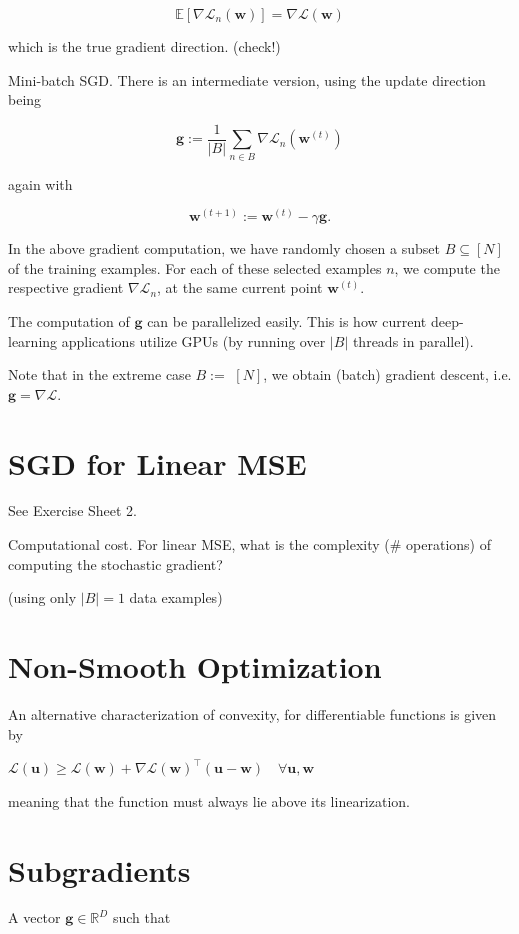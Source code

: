 \documentclass[10pt]{article}
\begin{document}
$$
\mathbb{E}\left[\nabla \mathcal{L}_{n}(\mathbf{w})\right]=\nabla \mathcal{L}(\mathbf{w})
$$

which is the true gradient direction. (check!)

Mini-batch SGD. There is an intermediate version, using the update direction being

$$
\mathbf{g}:=\frac{1}{|B|} \sum_{n \in B} \nabla \mathcal{L}_{n}\left(\mathbf{w}^{(t)}\right)
$$

again with

$$
\mathbf{w}^{(t+1)}:=\mathbf{w}^{(t)}-\gamma \mathbf{g} .
$$

In the above gradient computation, we have randomly chosen a subset $B \subseteq[N]$ of the training examples. For each of these selected examples $n$, we compute the respective gradient $\nabla \mathcal{L}_{n}$, at the same current point $\mathbf{w}^{(t)}$.

The computation of $\mathbf{g}$ can be parallelized easily. This is how current deep-learning applications utilize GPUs (by running over $|B|$ threads in parallel).

Note that in the extreme case $B:=$ $[N]$, we obtain (batch) gradient descent, i.e. $\mathbf{g}=\nabla \mathcal{L}$.

\section*{SGD for Linear MSE}
See Exercise Sheet 2.

Computational cost. For linear MSE, what is the complexity (\# operations) of computing the stochastic gradient?

(using only $|B|=1$ data examples)

\section*{Non-Smooth Optimization}
An alternative characterization of convexity, for differentiable functions is given by

$\mathcal{L}(\mathbf{u}) \geq \mathcal{L}(\mathbf{w})+\nabla \mathcal{L}(\mathbf{w})^{\top}(\mathbf{u}-\mathbf{w}) \quad \forall \mathbf{u}, \mathbf{w}$

meaning that the function must always lie above its linearization.

\section*{Subgradients}
A vector $\mathbf{g} \in \mathbb{R}^{D}$ such that
\end{document}
